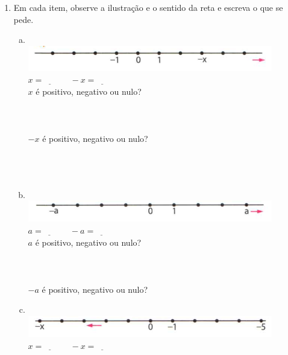 \documentclass[a4paper,14pt]{article}
\begin{document}
\begin{multicols}{2}
\begin{enumerate}
\begin{enumerate}[a)]
				\item O oposto do oposto de -(-2) é $\underline{~~~~~~}$. \\ 
				\item -(-(-4)) = $\underline{~~~~~~}$. \\
			\end{enumerate}
			\item Em cada item, observe a ilustração e o sentido da reta e escreva o que se pede.
			\begin{enumerate}[a)] 
				\item ~ \\ \includegraphics[width=1.1\linewidth]{6FMA22_imagens/imagem1} \\
				$x = \underline{~~~~~~} ~~~~~~~~ -x = \underline{~~~~~~}$ \\
				$x$ é positivo, negativo ou nulo? \\\\\\\\
				$-x$ é positivo, negativo ou nulo? \\\\\\\\
				\item ~ \\ \includegraphics[width=1.1\linewidth]{6FMA22_imagens/imagem2} \\
				$a = \underline{~~~~~~} ~~~~~~~~ -a = \underline{~~~~~~}$ \\
				$a$ é positivo, negativo ou nulo? \\\\\\\\
				$-a$ é positivo, negativo ou nulo? \\
				\item ~ \\ \includegraphics[width=1.1\linewidth]{6FMA22_imagens/imagem3} \\
				$x = \underline{~~~~~~} ~~~~~~~~ -x = \underline{~~~~~~}$ \\

\end{enumerate}
\end{enumerate}
\end{multicols}
\end{document}
